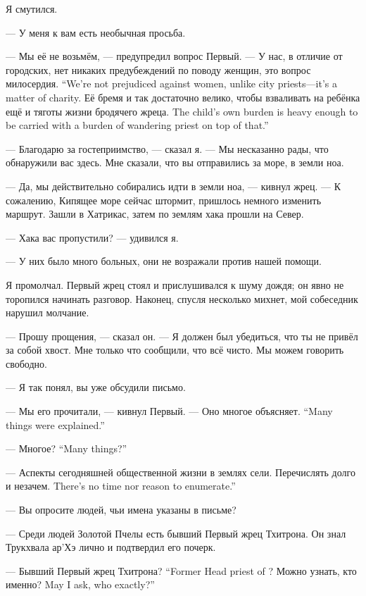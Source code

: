 Я смутился.

--- У меня к вам есть необычная просьба.

--- Мы её не возьмём, --- предупредил вопрос Первый.
{--- У нас, в отличие от городских, нет никаких предубеждений по поводу женщин, это вопрос милосердия.}
{``We're not prejudiced against women, unlike city priests---it's a matter of charity.}
{Её бремя и так достаточно велико, чтобы взваливать на ребёнка ещё и тяготы жизни бродячего жреца.}
{The child's own burden is heavy enough to be carried with a burden of wandering priest on top of that.''}

--- Благодарю за гостеприимство, --- сказал я.
--- Мы несказанно рады, что обнаружили вас здесь.
Мне сказали, что вы отправились за море, в земли ноа.

--- Да, мы действительно собирались идти в земли ноа, --- кивнул жрец.
--- К сожалению, Кипящее море сейчас штормит, пришлось немного изменить маршрут.
Зашли в Хатрикас, затем по землям хака прошли на Север.

--- Хака вас пропустили? --- удивился я.

--- У них было много больных, они не возражали против нашей помощи.

Я промолчал.
Первый жрец стоял и прислушивался к шуму дождя;
он явно не торопился начинать разговор.
Наконец, спусля несколько михнет, мой собеседник нарушил молчание.

--- Прошу прощения, --- сказал он.
--- Я должен был убедиться, что ты не привёл за собой хвост.
Мне только что сообщили, что всё чисто.
Мы можем говорить свободно.

--- Я так понял, вы уже обсудили письмо.

--- Мы его прочитали, --- кивнул Первый.
{--- Оно многое объясняет.}
{``Many things were explained.''}

{--- Многое?}
{``Many things?''}

--- Аспекты сегодняшней общественной жизни в землях сели.
{Перечислять долго и незачем.}
{There's no time nor reason to enumerate.''}

--- Вы опросите людей, чьи имена указаны в письме?

--- Среди людей Золотой Пчелы есть бывший Первый жрец Тхитрона.
Он знал Трукхвала ар'Хэ лично и подтвердил его почерк.

{--- Бывший Первый жрец Тхитрона?}
{``Former Head priest of \Tchitron?}
{Можно узнать, кто именно?}
{May I ask, who exactly?''}

